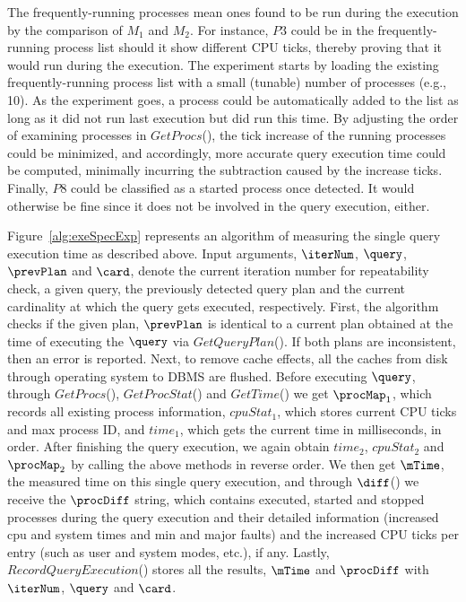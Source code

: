 The frequently-running processes mean ones found to be run during 
the execution by the comparison of $M_{1}$ and $M_{2}$. 
For instance, $P$3 could be in the frequently-running process list should it 
show different CPU ticks, thereby proving that it would run during the execution. 
The experiment starts by loading the existing frequently-running process list 
with a small (tunable) number of processes (e.g., 10). 
As the experiment goes, a process could be automatically added to the list 
as long as it did not run last execution but did run this time. 
By adjusting the order of examining processes in $GetProcs$(), 
the tick increase of the running processes could be minimized, and accordingly, 
more accurate query execution time could be computed, minimally 
incurring the subtraction caused by the increase ticks. 
Finally, $P$8 could be classified as a started process once detected. 
It would otherwise be fine since it does not be involved in the query 
execution, either. 

Figure~\ref{alg:exeSpecExp} represents an algorithm of measuring 
the single query execution time as described above. 
Input arguments, $\iterNum$, $\query$, $\prevPlan$ and $\card$, 
denote the current iteration number for repeatability check, 
a given query, the previously detected query plan 
and the current cardinality at which the query gets executed, 
respectively. 
First, the algorithm checks if the given plan, $\prevPlan$ 
is identical to a current plan obtained 
at the time of executing the $\query$ via $GetQueryPlan$(). 
If both plans are inconsistent, then an error is reported. 
Next, to remove cache effects, all the caches from disk through 
operating system to DBMS are flushed.
Before executing $\query$, through $GetProcs$(), $GetProcStat$() and 
$GetTime$() we get $\procMap_{1}$, which 
records all existing process information, 
$cpuStat_{1}$, which stores current CPU ticks and max process ID, and 
$time_{1}$, which gets the current time in milliseconds, in order. 
After finishing the query execution, we again obtain 
$time_{2}$, $cpuStat_{2}$ and $\procMap_{2}$ by calling the above 
methods in reverse order. 
We then get $\mTime$, the measured time on this single query execution, 
and through $\diff$() we receive 
the $\procDiff$ string, which contains executed, started and stopped 
processes during the query execution and their detailed information (increased 
cpu and system times and min and major faults) and the increased CPU ticks 
per entry (such as user and system modes, etc.), if any. 
Lastly, $RecordQueryExecution$() stores all the results, 
$\mTime$ and $\procDiff$ with $\iterNum$, $\query$ and $\card$. 

